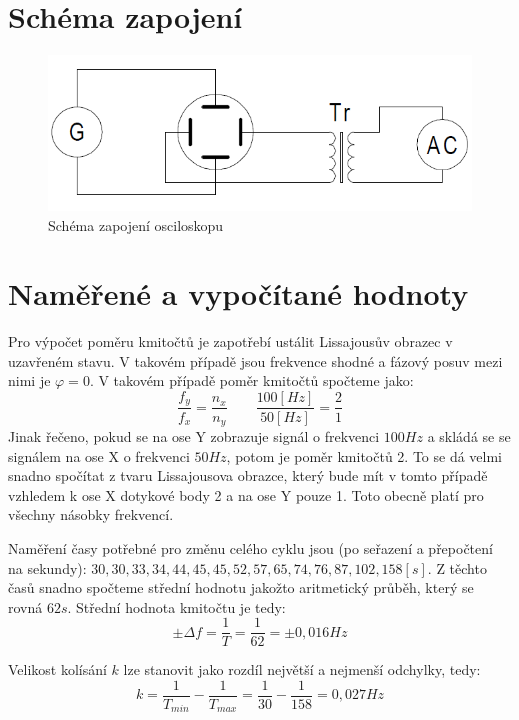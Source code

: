 \documentclass[12pt]{article} %
\begin{document}
\section{Schéma zapojení}
\begin{figure}[H]
\center
\includegraphics[scale=0.8]{schema.png}
\caption{Schéma zapojení osciloskopu}
\end{figure}

\section{Naměřené a vypočítané hodnoty}
Pro výpočet poměru kmitočtů je zapotřebí ustálit Lissajousův obrazec v uzavřeném stavu. V takovém případě jsou frekvence shodné a fázový posuv mezi nimi je $\varphi = 0$. V takovém případě poměr kmitočtů spočteme jako:
\begin{equation}
\frac{f_y}{f_x} = \frac{n_x}{n_y} \qquad \frac{100 [Hz]}{50 [Hz]} = \frac{2}{1}
\end{equation}
Jinak řečeno, pokud se na ose Y zobrazuje signál o frekvenci $100Hz$ a skládá se se signálem na ose X o frekvenci $50Hz$, potom je poměr kmitočtů 2. To se dá velmi snadno spočítat z tvaru Lissajousova obrazce, který bude mít v tomto případě vzhledem k ose X dotykové body 2 a na ose Y pouze 1. Toto obecně platí pro všechny násobky frekvencí.

Naměření časy potřebné pro změnu celého cyklu jsou (po seřazení a přepočtení na sekundy):
$30, 30, 33, 34, 44, 45, 45, 52, 57, 65, 74, 76, 87, 102, 158 [s]$. Z těchto časů snadno spočteme střední hodnotu jakožto aritmetický průběh, který se rovná $62s$. Střední hodnota kmitočtu je tedy:
\begin{equation}
\pm \Delta f = \frac{1}{T} = \frac{1}{62} = \pm 0,016Hz
\end{equation}

Velikost kolísání $k$ lze stanovit jako rozdíl největší a nejmenší odchylky, tedy:
\begin{equation}
k = \frac{1}{T_{min}} - \frac{1}{T_{max}} = \frac{1}{30} - \frac{1}{158} = 0,027Hz
\end{equation}
\end{document}

